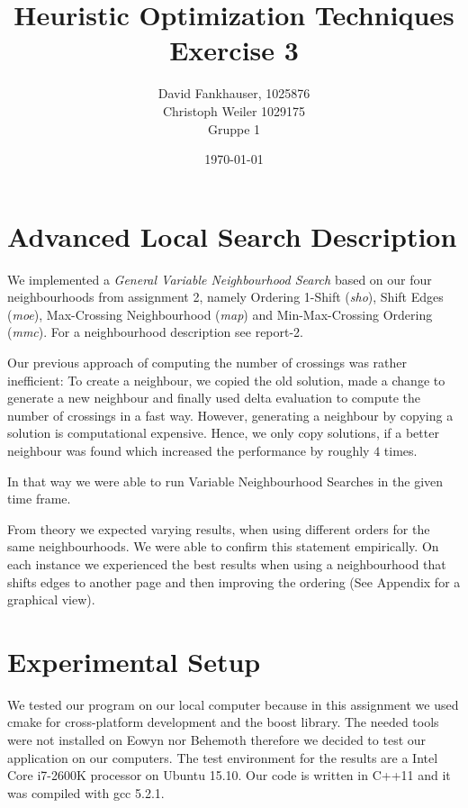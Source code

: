 \documentclass[11pt]{article}
\title{\textbf{Heuristic Optimization Techniques }\\Exercise 3}
\author{David Fankhauser, 1025876\\ Christoph Weiler 1029175\\Gruppe 1}
\date{\today}
\begin{document}
\lstset{language=C++}
\maketitle
 
\section{Advanced Local Search Description}
We implemented a \textit{General Variable Neighbourhood Search} based on our four neighbourhoods from assignment 2, namely Ordering 1-Shift (\textit{sho}), Shift Edges (\textit{moe}), 
Max-Crossing Neighbourhood (\textit{map}) and Min-Max-Crossing Ordering (\textit{mmc}).
For a neighbourhood description see report-2.

Our previous approach of computing the number of crossings was rather inefficient: To create a neighbour, we copied the old solution, made a change to generate a new neighbour and finally used delta evaluation to compute the number of crossings in a fast way.
However, generating a neighbour by copying a solution is computational expensive. Hence, we only copy solutions, if a better neighbour was found which increased the performance by roughly $4$ times.

In that way we were able to run Variable Neighbourhood Searches in the given time frame.

From theory we expected varying results, when using different orders for the same neighbourhoods.
We were able to confirm this statement empirically.
On each instance we experienced the best results when using a neighbourhood that shifts edges to another page and then improving the ordering (See Appendix for a graphical view).

\section{Experimental Setup}
We tested our program on our local computer because in this assignment we used cmake for cross-platform development and the boost library.
The needed tools were not installed on Eowyn nor Behemoth therefore we decided to test our application on our computers.
The test environment for the results are a Intel Core i7-2600K processor on Ubuntu 15.10.
Our code is written in C++11 and it was compiled with gcc 5.2.1.

\newpage
\end{document}
